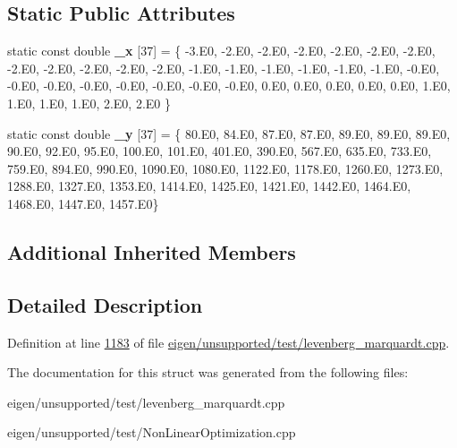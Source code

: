 \subsection*{Static Public Attributes}
\begin{DoxyCompactItemize}
\item 
\mbox{\label{structthurber__functor_a2d8a8998d12ede086b9049618cc0e5b3}} 
static const double {\bfseries \+\_\+x} \mbox{[}37\mbox{]} = \{ -\/3.\+E0, -\/2.\+E0, -\/2.\+E0, -\/2.\+E0, -\/2.\+E0, -\/2.\+E0, -\/2.\+E0, -\/2.\+E0, -\/2.\+E0, -\/2.\+E0, -\/2.\+E0, -\/2.\+E0, -\/1.\+E0, -\/1.\+E0, -\/1.\+E0, -\/1.\+E0, -\/1.\+E0, -\/1.\+E0, -\/0.\+E0, -\/0.\+E0, -\/0.\+E0, -\/0.\+E0, -\/0.\+E0, -\/0.\+E0, -\/0.\+E0, -\/0.\+E0, 0.\+E0, 0.\+E0, 0.\+E0, 0.\+E0, 0.\+E0, 1.\+E0, 1.\+E0, 1.\+E0, 1.\+E0, 2.\+E0, 2.\+E0 \}
\item 
\mbox{\label{structthurber__functor_a670386b271722c6156e7baa4b6473962}} 
static const double {\bfseries \+\_\+y} \mbox{[}37\mbox{]} = \{ 80.\+E0, 84.\+E0, 87.\+E0, 87.\+E0, 89.\+E0, 89.\+E0, 89.\+E0, 90.\+E0, 92.\+E0, 95.\+E0, 100.\+E0, 101.\+E0, 401.\+E0, 390.\+E0, 567.\+E0, 635.\+E0, 733.\+E0, 759.\+E0, 894.\+E0, 990.\+E0, 1090.\+E0, 1080.\+E0, 1122.\+E0, 1178.\+E0, 1260.\+E0, 1273.\+E0, 1288.\+E0, 1327.\+E0, 1353.\+E0, 1414.\+E0, 1425.\+E0, 1421.\+E0, 1442.\+E0, 1464.\+E0, 1468.\+E0, 1447.\+E0, 1457.\+E0\}
\end{DoxyCompactItemize}
\subsection*{Additional Inherited Members}


\subsection{Detailed Description}


Definition at line \hyperlink{eigen_2unsupported_2test_2levenberg__marquardt_8cpp_source_l01183}{1183} of file \hyperlink{eigen_2unsupported_2test_2levenberg__marquardt_8cpp_source}{eigen/unsupported/test/levenberg\+\_\+marquardt.\+cpp}.



The documentation for this struct was generated from the following files\+:\begin{DoxyCompactItemize}
\item 
eigen/unsupported/test/levenberg\+\_\+marquardt.\+cpp\item 
eigen/unsupported/test/\+Non\+Linear\+Optimization.\+cpp\end{DoxyCompactItemize}
